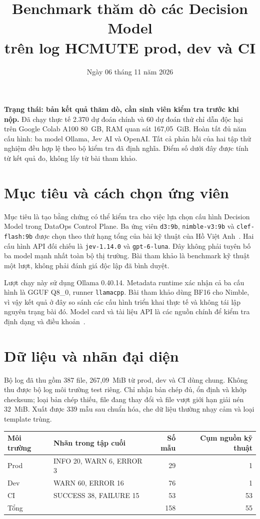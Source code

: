\documentclass[11pt,a4paper]{article}
\title{Benchmark thăm dò các Decision Model\\trên log HCMUTE prod, dev và CI}
\author{}
\date{Ngày 06 tháng 11 năm 2026}
\begin{document}
\maketitle
\textbf{Trạng thái: bản kết quả thăm dò, cần sinh viên kiểm tra trước khi nộp.}
Đã chạy thực tế 2.370 dự đoán chính và 60 dự đoán thử chỉ dẫn độc hại trên Google Colab
A100 80~GB, RAM quan sát 167,05~GiB. Hoàn tất đủ năm cấu hình: ba model Ollama,
Jev AI và OpenAI. Tất cả phản hồi của hai tập thử nghiệm đều hợp lệ theo bộ kiểm tra
đã định nghĩa. Điểm số dưới đây được tính từ kết quả đo, không lấy từ bài tham khảo.

\section{Mục tiêu và cách chọn ứng viên}
Mục tiêu là tạo bằng chứng có thể kiểm tra cho việc lựa chọn cấu hình Decision Model
trong DataOps Control Plane. Ba ứng viên \texttt{d3:9b}, \texttt{nimble-v3:9b} và
\texttt{clef-flash:9b} được chọn theo thứ hạng tổng của bài kỹ thuật của Hồ Việt Anh~\cite{article}.
Hai cấu hình API đối chiếu là \texttt{jev-1.14.0} và \texttt{gpt-6-luna}.
Đây không phải tuyên bố ba model mạnh nhất toàn bộ thị trường. Bài tham khảo là
benchmark kỹ thuật một lượt, không phải đánh giá độc lập đã bình duyệt.

Lượt chạy này sử dụng Ollama 0.40.14. Metadata runtime xác nhận cả ba cấu hình là
GGUF Q8\_0, runner \texttt{llamacpp}. Bài tham khảo dùng BF16 cho Nimble, vì vậy
kết quả ở đây so sánh các cấu hình triển khai thực tế và không tái lập nguyên trạng bài đó.
Model card và tài liệu API là các nguồn chính để kiểm tra định dạng và điều khoản~\cite{d3,nimble,clef,ollama}.

\section{Dữ liệu và nhãn đại diện}
Bộ log đã thu gồm 387 file, 267,09~MiB từ prod, dev và CI dùng chung. Không thu được
bộ log môi trường test riêng. Chỉ nhận bản chép đủ, ổn định và khớp checksum; loại
bản chép thiếu, file đang thay đổi và file vượt giới hạn giải nén 32~MiB.
Xuất được 339 mẫu sau chuẩn hóa, che dữ liệu thường nhạy cảm và loại template trùng.

\begin{center}
\begin{tabular}{llrr}
\toprule
Môi trường & Nhãn trong tập cuối & Số mẫu & Cụm nguồn kỹ thuật\\
\midrule
Prod & INFO 20, WARN 6, ERROR 3 & 29 & 1\\
Dev & WARN 60, ERROR 16 & 76 & 1\\
CI & SUCCESS 38, FAILURE 15 & 53 & 53\\
\midrule
Tổng & & 158 & 55\\
\bottomrule
\end{tabular}
\end{center}
\end{document}
